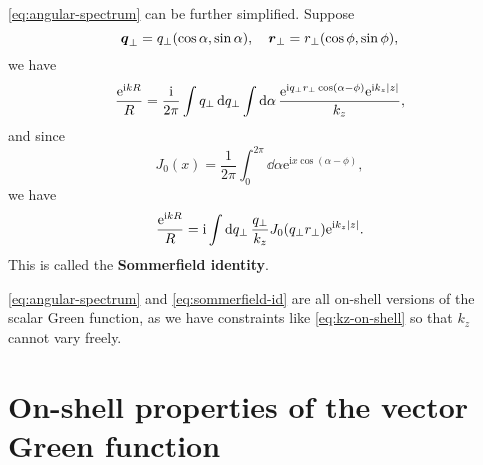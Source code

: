 \documentclass[hyperref, a4paper]{article}
\newcommand*{\ii}{\mathrm{i}}
\newcommand*{\ee}{\mathrm{e}}
\newcommand*{\concept}[1]{{\textbf{#1}}}
\begin{document}
\eqref{eq:angular-spectrum} can be further simplified. Suppose 
\[
    \vb*{q}_\bot = q_\bot (\cos \alpha, \sin \alpha), \quad \vb*{r}_\bot = r_\bot (\cos \phi, \sin \phi),
\]
we have 
\[
    \frac{\ee^{\ii k R}}{R} = \frac{\ii}{2\pi} \int q_\bot \dd{q_\bot} \int \dd{\alpha} \frac{\ee^{\ii q_\bot r_\bot \cos(\alpha - \phi)} \ee^{\ii k_z \abs*{z}}}{k_z},
\]
and since 
\[
    J_0(x) = \frac{1}{2\pi} \int_0^{2\pi} \dd{\alpha} \ee^{\ii x \cos(\alpha - \phi)},
\]
we have 
\begin{equation}
    \frac{\ee^{\ii k R}}{R} = \ii \int \dd{q_\bot} \frac{q_\bot}{k_z} J_0(q_\bot r_\bot) \ee^{\ii k_z \abs*{z}}.
    \label{eq:sommerfield-id}
\end{equation}
This is called the \concept{Sommerfield identity}.

\eqref{eq:angular-spectrum} and \eqref{eq:sommerfield-id} are all on-shell versions of the scalar Green function, as we have constraints like \eqref{eq:kz-on-shell} so that $k_z$ cannot vary freely.

\section{On-shell properties of the vector Green function}
\end{document}
